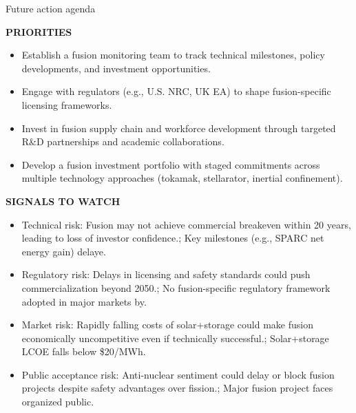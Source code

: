 \documentclass[10pt,a4paper]{article}
\begin{document}
\clearpage
{\sffamily\fontsize{21}{26}\selectfont\color{BONavy} Future action agenda}\par\vspace{7pt}
\begin{minipage}[t]{0.47\linewidth}
{\textcolor{BOGreen}{\scriptsize\bfseries PRIORITIES}}\par\vspace{3pt}
{\small\begin{itemize}
\item Establish a fusion monitoring team to track technical milestones, policy developments, and investment opportunities.
\item Engage with regulators (e.g., U.S. NRC, UK EA) to shape fusion-specific licensing frameworks.
\item Invest in fusion supply chain and workforce development through targeted R\&D partnerships and academic collaborations.
\item Develop a fusion investment portfolio with staged commitments across multiple technology approaches (tokamak, stellarator, inertial confinement).
\end{itemize}}
\end{minipage}\hfill\begin{minipage}[t]{0.45\linewidth}
{\textcolor{BOGreen}{\scriptsize\bfseries SIGNALS TO WATCH}}\par\vspace{3pt}
{\small\begin{itemize}
\item Technical risk: Fusion may not achieve commercial breakeven within 20 years, leading to loss of investor confidence.; Key milestones (e.g., SPARC net energy gain) delaye.
\item Regulatory risk: Delays in licensing and safety standards could push commercialization beyond 2050.; No fusion-specific regulatory framework adopted in major markets by.
\item Market risk: Rapidly falling costs of solar+storage could make fusion economically uncompetitive even if technically successful.; Solar+storage LCOE falls below \$20/MWh.
\item Public acceptance risk: Anti-nuclear sentiment could delay or block fusion projects despite safety advantages over fission.; Major fusion project faces organized public.
\end{itemize}}
\end{minipage}
\end{document}
